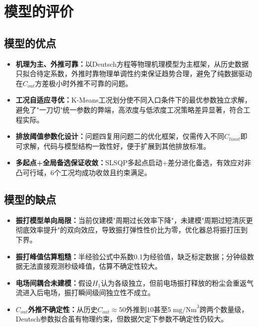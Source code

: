 
\section{模型的评价}

\subsection{模型的优点}
\begin{itemize}[itemindent=2em]
\item \textbf{机理为主、外推可靠：}以Deutsch方程等物理机理模型为主框架，从历史数据只拟合待定系数，外推时靠物理单调性约束保证趋势合理，避免了纯数据驱动在$C_{out}$方差极小时外推不可靠的问题。
\item \textbf{工况自适应寻优：}K-Means工况划分使不同入口条件下的最优参数独立求解，避免了"一刀切"统一参数的弊端，高浓度与低浓度工况策略差异显著，符合工程实际。
\item \textbf{排放阈值参数化设计：}问题四复用问题二的优化框架，仅需传入不同$C_{limit}$即可求解，代码与模型结构一致性好，便于扩展到其他排放标准。
\item \textbf{多起点+全局备选保证收敛：}SLSQP多起点启动+差分进化备选，有效应对非凸可行域，6个工况均成功收敛且约束满足。
\end{itemize}

\subsection{模型的缺点}
\begin{itemize}[itemindent=2em]
\item \textbf{振打模型单向局限：}当前仅建模"周期过长效率下降"，未建模"周期过短清灰更彻底效率提升"的双向效应，导致振打弹性性价比为零，优化器总将振打压到下界。
\item \textbf{振打峰值估算粗糙：}半经验公式中系数0.1为经验值，缺乏标定数据；分钟级数据无法直接观测秒级峰值，估算不确定性较大。
\item \textbf{电场间耦合未建模：}假设$H_1$认为各级独立，但前电场振打释放的粉尘会重返气流进入后电场，振打瞬间级间独立性不成立。
\item \textbf{$C_{out}$外推不确定性：}从历史$C_{out}\approx 50$外推到$10$甚至$5\;\text{mg/Nm}^3$跨两个数量级，Deutsch参数拟合虽有物理约束，但数据欠定下参数不确定性仍较大。
\end{itemize}
